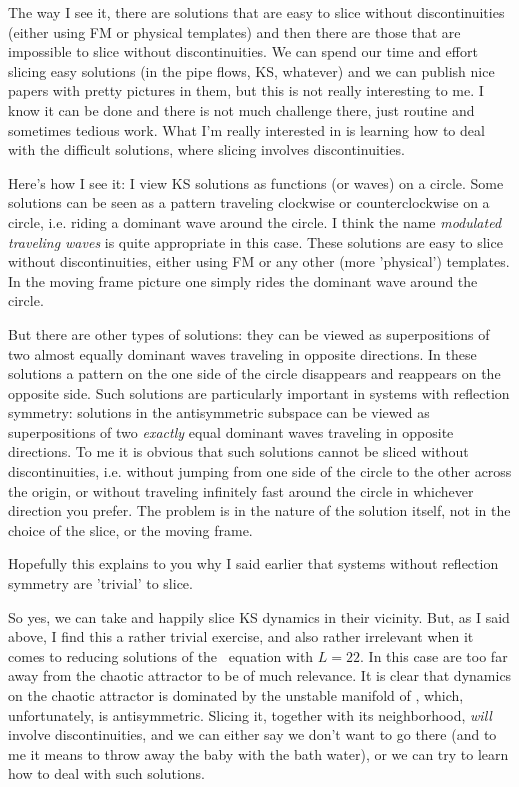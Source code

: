 \begin{description}
    The way I see it, there are solutions that are easy to slice without discontinuities (either using FM or physical templates) and then there are those that are impossible to slice without discontinuities.  We can spend our time and effort slicing easy solutions (in the pipe flows, KS, whatever) and we can publish nice papers with pretty pictures in them, but this is not really interesting to me.  I know it can be done and there is not much challenge there, just routine and sometimes tedious work.  What I'm really interested in is learning how to deal with the difficult solutions, where slicing involves discontinuities.

    Here's how I see it: I view KS solutions as functions (or waves) on a circle.  Some solutions can be seen as a pattern traveling clockwise or counterclockwise on a circle, i.e. riding a dominant wave around the circle.  I think the name {\em modulated traveling waves} is quite appropriate in this case.  These solutions are easy to slice without discontinuities, either using FM or any other (more 'physical') templates.  In the moving frame picture one simply rides the dominant wave around the circle.

    But there are other types of solutions: they can be viewed as superpositions of two almost equally dominant waves traveling in opposite directions.  In these solutions a pattern on the one side of the circle disappears and reappears on the opposite side.  Such solutions are particularly important in systems with reflection symmetry: solutions in the antisymmetric subspace can be viewed as superpositions of two {\em exactly} equal dominant waves traveling in opposite directions.  To me it is obvious that such solutions cannot be sliced without discontinuities, i.e. without jumping from one side of the circle to the other across the origin, or without traveling infinitely fast around the circle in whichever direction you prefer.  The problem is in the nature of the solution itself, not in the choice of the slice, or the moving frame.

    Hopefully this explains to you why I said earlier that systems without reflection symmetry are 'trivial' to slice.

    So yes, we can take  and happily slice KS dynamics in their vicinity.  But, as I said above, I find this a rather trivial exercise, and also rather irrelevant when it comes to reducing solutions of the \KS\ equation with $L = 22$.  In this case  are too far away from the chaotic attractor to be of much relevance.  It is clear that dynamics on the chaotic attractor is dominated by the unstable manifold of , which, unfortunately, is antisymmetric.  Slicing it, together with its neighborhood, {\em will} involve discontinuities, and we can either say we don't want to go there (and to me it means to throw away the baby with the bath water), or we can try to learn how to deal with such solutions.


\end{description}
